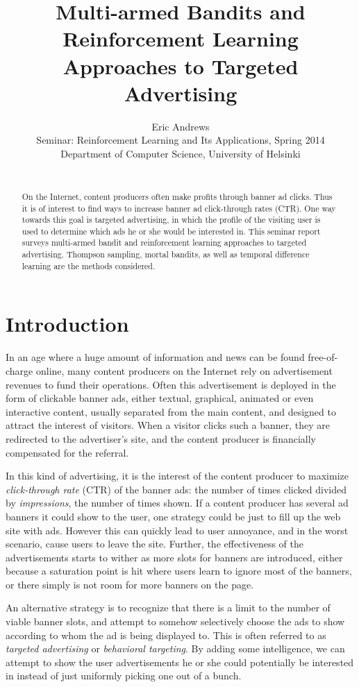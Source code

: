 \documentclass{article} %
\title{Multi-armed Bandits and Reinforcement Learning Approaches to Targeted
Advertising}
\author{
Eric Andrews \\
Seminar: Reinforcement Learning and Its Applications, Spring 2014 \\
Department of Computer Science, University of Helsinki\\\\
}
\begin{document}
\maketitle

\begin{abstract}
  On the Internet, content producers often make profits through banner ad
  clicks. Thus it is of interest to find ways to increase banner ad
  click-through rates (CTR). One way towards this goal is targeted advertising,
  in which the profile of the visiting user is used to determine which ads he
  or she would be interested in. This seminar report surveys multi-armed bandit
  and reinforcement learning approaches to targeted advertising. Thompson
  sampling, mortal bandits, as well as temporal difference learning are the
  methods considered.
\end{abstract}

\section{Introduction}

In an age where a huge amount of information and news can be found
free-of-charge online, many content producers on the Internet rely on
advertisement revenues to fund their operations. Often this advertisement is
deployed in the form of clickable banner ads, either textual, graphical,
animated or even interactive content, usually separated from the main content,
and designed to attract the interest of visitors. When a visitor clicks such a
banner, they are redirected to the advertiser's site, and the content producer
is financially compensated for the referral.

In this kind of advertising, it is the interest of the content producer to
maximize \emph{click-through rate} (CTR) of the banner ads: the number of times
clicked divided by \emph{impressions}, the number of times shown. If a content
producer has several ad banners it could show to the user, one strategy could
be just to fill up the web site with ads. However this can quickly lead to user
annoyance, and in the worst scenario, cause users to leave the site. Further,
the effectiveness of the advertisements starts to wither as more slots for
banners are introduced, either because a saturation point is hit where users
learn to ignore most of the banners, or there simply is not room for more
banners on the page.

An alternative strategy is to recognize that there is a limit to the number of
viable banner slots, and attempt to somehow selectively choose the ads to show
according to whom the ad is being displayed to. This is often referred to as
\emph{targeted advertising} or \emph{behavioral targeting}. By adding some
intelligence, we can attempt to show the user advertisements he or she could
potentially be interested in instead of just uniformly picking one out of a
bunch.
\end{document}
